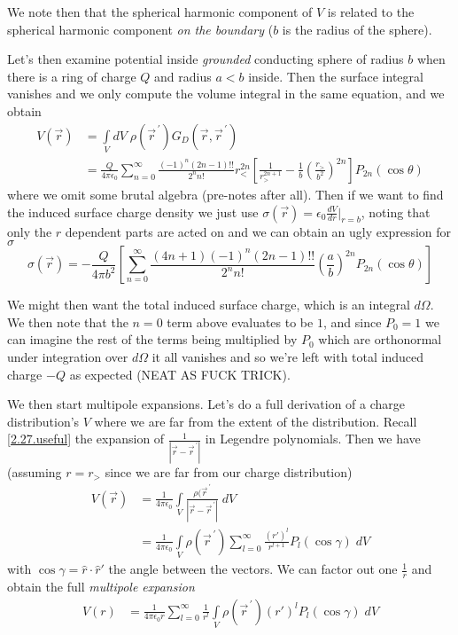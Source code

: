 \documentclass[10pt]{report}
\newcommand{\rd}[2]{\frac{d#1}{d#2}}
\newcommand{\pvec}[1]{\vec{#1}^{\,\prime}}
\newcommand{\abs}[1]{\left|#1\right|}
\begin{document}
We note then that the spherical harmonic component of $V$ is related to the spherical harmonic component \emph{on the boundary} ($b$ is the radius of the sphere). 

Let's then examine potential inside \emph{grounded} conducting sphere of radius $b$ when there is a ring of charge $Q$ and radius $a < b$ inside. Then the surface integral vanishes and we only compute the volume integral in the same equation, and we obtain
\begin{align}
    V(\vec{r}) &= \displaystyle\int\limits_{V}^{}dV\; \rho(\pvec{r})G_D(\vec{r}, \pvec{r})\\
    &= \frac{Q}{4\pi\epsilon_0}\sum_{n=0}^{\infty}\frac{(-1)^n(2n-1)!!}{2^n n!}r_<^{2n}\left[ \frac{1}{r_>^{2n+1}} - \frac{1}{b}\left( \frac{r_>}{b^2} \right)^{2n} \right]P_{2n}(\cos\theta)
\end{align}
where we omit some brutal algebra (pre-notes after all). Then if we want to find the induced surface charge density we just use $\sigma(\vec{r}) = \epsilon_0\rd{V}{r}\Big|_{r = b}$, noting that only the $r$ dependent parts are acted on and we can obtain an ugly expression for $\sigma$
\begin{equation}
    \sigma(\vec{r}) = -\frac{Q}{4\pi b^2}\left[ \sum_{n=0}^{\infty}\frac{(4n+1)(-1)^n(2n-1)!!}{2^nn!}\left( \frac{a}{b} \right)^{2n}P_{2n}(\cos\theta) \right]
\end{equation}

We might then want the total induced surface charge, which is an integral $d\Omega$. We then note that the $n=0$ term above evaluates to be $1$, and since $P_0 = 1$ we can imagine the rest of the terms being multiplied by $P_0$ which are orthonormal under integration over $d\Omega$ it all vanishes and so we're left with total induced charge $-Q$ as expected (NEAT AS FUCK TRICK).

We then start multipole expansions. Let's do a full derivation of a charge distribution's $V$ where we are far from the extent of the distribution. Recall \eqref{2.27.useful} the expansion of $\frac{1}{\abs{\vec{r} - \pvec{r}}}$ in Legendre polynomials. Then we have (assuming $r = r_>$ since we are far from our charge distribution)
\begin{align}
    V(\vec{r}) &= \frac{1}{4\pi\epsilon_0}\displaystyle\int\limits_{V}^{}\frac{\rho(\pvec{r}}{\abs{\vec{r} - \pvec{r}}}\;dV\\
    &= \frac{1}{4\pi\epsilon_0}\displaystyle\int\limits_{V}^{}\rho(\pvec{r}) \sum_{l=0}^{\infty}\frac{\left( r' \right)^l}{r^{l+1}}P_l(\cos \gamma)\;dV
\end{align}
with $\cos\gamma  = \hat{r} \cdot \hat{r}'$ the angle between the vectors. We can factor out one $\frac{1}{r}$ and obtain the full \emph{multipole expansion}
\begin{align}
    V(r)&= \frac{1}{4\pi\epsilon_0r}\sum_{l=0}^{\infty}\frac{1}{r^l}\displaystyle\int\limits_{V}^{}\rho(\pvec{r}) \left( r' \right)^lP_l(\cos \gamma)\;dV
\end{align}
\end{document}
